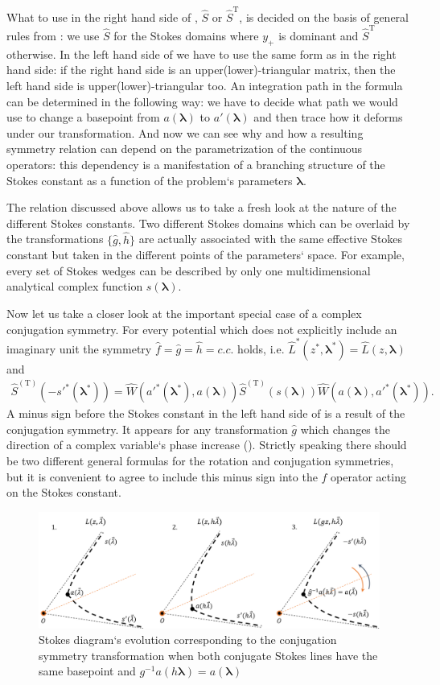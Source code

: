 \documentclass[12pt]{iopart}
\def\S{\hat{S}}
\def\W{\hat{W}}
\def\f{\hat{f}}
\def\g{\hat{g}}
\def\h{\hat{h}}
\def\L{\hat{L}}
\def\lmbd{\bm{\lambda}}
\def\T{\mathrm{T}}
\begin{document}
What to use in the right hand side of , $\S$ or $\S^{\T}$, is decided on the basis of general rules from : we use $\S$ for the Stokes domains where $y_+$ is dominant and $\S^{\T}$ otherwise. In the left hand side of  we have to use the same form as in the right hand side: if the right hand side is an upper(lower)-triangular matrix, then the left hand side is upper(lower)-triangular too. An integration path in the formula can be determined in the following way: we have to decide what path we would use to change a basepoint from $a(\lmbd)$ to $a'(\lmbd)$ and then trace how it deforms under our transformation. And now we can see why and how a resulting symmetry relation can depend on the parametrization of the continuous operators: this dependency is a manifestation of a branching structure of the Stokes constant as a function of the problem`s parameters $\lmbd$.

The relation discussed above allows us to take a fresh look at the nature of the different Stokes constants. Two different Stokes domains which can be overlaid by the transformations $\{\g,\h\}$ are actually associated with the same effective Stokes constant but taken in the different points of the parameters` space. For example, every set of Stokes wedges can be described by only one multidimensional analytical complex function $s(\lmbd)$.

Now let us take a closer look at the important special case of a complex conjugation symmetry. For every potential which does not explicitly include an imaginary unit the symmetry $\f=\g=\h=c.c.$ holds, 
i.e. $\L^*(z^*,\lmbd^*)=\L(z,\lmbd)$ and
\begin{eqnarray}
\S^{(\T)} \left( -s'^*(\lmbd^*) \right) = 
\W \left( a'^*(\lmbd^*),a(\lmbd) \right)
\S^{(\T)} \left( s(\lmbd) \right)
\W \left( a(\lmbd),a'^*(\lmbd^*) \right).
\label{eq:cnjgtn}
\end{eqnarray}
A minus sign before the Stokes constant in the left hand side of  is a result of the conjugation symmetry. It appears for any transformation $\g$ which changes the direction of a complex variable`s phase increase (). Strictly speaking there should be two different general formulas for the rotation and conjugation symmetries, but it is convenient to agree to include this minus sign into the $\f$ operator acting on the Stokes constant.

\begin{figure}
\centering
\noindent
\includegraphics[scale=.5]{stuff/cs.png}
\caption{Stokes diagram`s evolution corresponding to the conjugation symmetry transformation when both conjugate Stokes lines have the same basepoint and $g^{-1}a(h\lmbd)=a(\lmbd)$}
\label{fig:cst}
\end{figure} 
\end{document}

